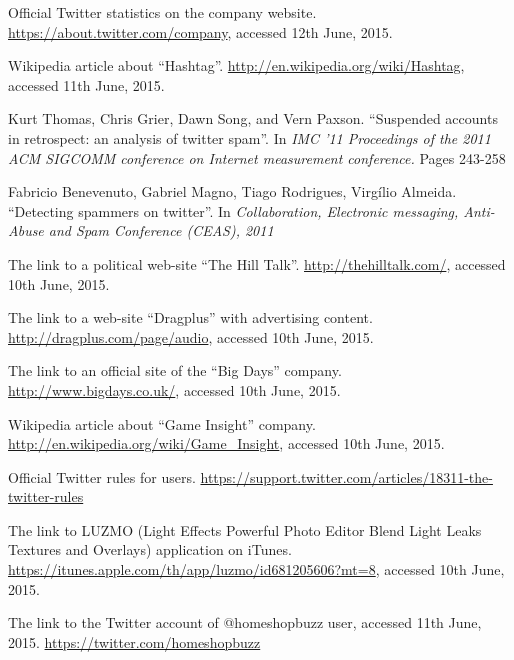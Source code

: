 \documentclass[journal, a4paper, 12pt]{article}
\begin{document}
\begin{thebibliography}{10}

    Official Twitter statistics on the company website.
    \url{https://about.twitter.com/company}, accessed 12th June, 2015.
    
    Wikipedia article about ``Hashtag''.
    \url{http://en.wikipedia.org/wiki/Hashtag}, accessed 11th June, 2015.
      
    Kurt Thomas, Chris Grier, Dawn Song, and Vern Paxson. ``Suspended accounts in    retrospect: an analysis of twitter spam''. In \textit{IMC '11 Proceedings of the 2011 ACM SIGCOMM conference on Internet measurement conference.} Pages 243-258 
    
    Fabricio Benevenuto, Gabriel Magno, Tiago Rodrigues, Virgílio Almeida. ``Detecting spammers on twitter''. In \textit{Collaboration, Electronic messaging, Anti-Abuse and Spam Conference (CEAS), 2011}

    The link to a political web-site ``The Hill Talk''.
    \url{http://thehilltalk.com/}, accessed 10th June, 2015.

    The link to a web-site ``Dragplus'' with advertising content.
      \url{http://dragplus.com/page/audio}, accessed 10th June, 2015.

    The link to an official site of the ``Big Days'' company.
      \url{http://www.bigdays.co.uk/}, accessed 10th June, 2015.

      Wikipedia article about ``Game Insight'' company.
    \url{http://en.wikipedia.org/wiki/Game_Insight}, accessed 10th June, 2015.
    
    Official Twitter rules for users.
    \url{https://support.twitter.com/articles/18311-the-twitter-rules}
    
      The link to LUZMO (Light Effects Powerful Photo Editor Blend Light Leaks Textures and Overlays) application on iTunes.
    \url{https://itunes.apple.com/th/app/luzmo/id681205606?mt=8}, accessed 10th June, 2015.
    
    The link to the Twitter account of @homeshopbuzz user, accessed 11th June, 2015.
    \url{https://twitter.com/homeshopbuzz}

\end{thebibliography}

\end{document}
